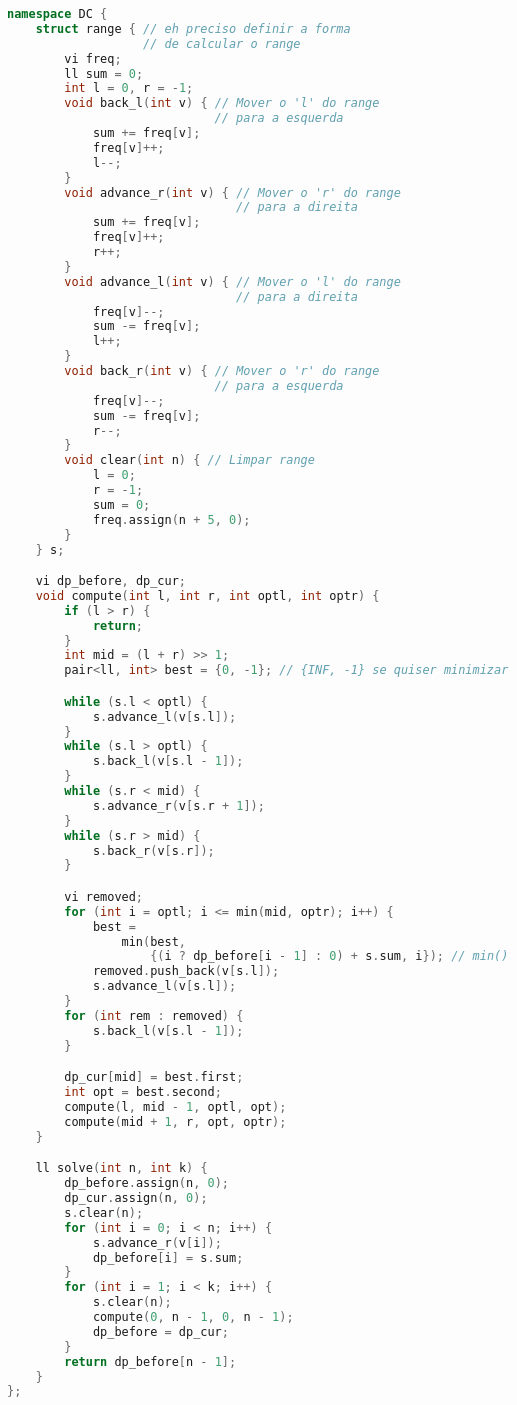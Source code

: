 \documentclass[10pt, a4paper, oneside]{book}
\begin{document}
\begin{lstlisting}[language=C++]
namespace DC {
    struct range { // eh preciso definir a forma
                   // de calcular o range
        vi freq;
        ll sum = 0;
        int l = 0, r = -1;
        void back_l(int v) { // Mover o 'l' do range
                             // para a esquerda
            sum += freq[v];
            freq[v]++;
            l--;
        }
        void advance_r(int v) { // Mover o 'r' do range
                                // para a direita
            sum += freq[v];
            freq[v]++;
            r++;
        }
        void advance_l(int v) { // Mover o 'l' do range
                                // para a direita
            freq[v]--;
            sum -= freq[v];
            l++;
        }
        void back_r(int v) { // Mover o 'r' do range
                             // para a esquerda
            freq[v]--;
            sum -= freq[v];
            r--;
        }
        void clear(int n) { // Limpar range
            l = 0;
            r = -1;
            sum = 0;
            freq.assign(n + 5, 0);
        }
    } s;

    vi dp_before, dp_cur;
    void compute(int l, int r, int optl, int optr) {
        if (l > r) {
            return;
        }
        int mid = (l + r) >> 1;
        pair<ll, int> best = {0, -1}; // {INF, -1} se quiser minimizar

        while (s.l < optl) {
            s.advance_l(v[s.l]);
        }
        while (s.l > optl) {
            s.back_l(v[s.l - 1]);
        }
        while (s.r < mid) {
            s.advance_r(v[s.r + 1]);
        }
        while (s.r > mid) {
            s.back_r(v[s.r]);
        }

        vi removed;
        for (int i = optl; i <= min(mid, optr); i++) {
            best =
                min(best,
                    {(i ? dp_before[i - 1] : 0) + s.sum, i}); // min() se quiser minimizar
            removed.push_back(v[s.l]);
            s.advance_l(v[s.l]);
        }
        for (int rem : removed) {
            s.back_l(v[s.l - 1]);
        }

        dp_cur[mid] = best.first;
        int opt = best.second;
        compute(l, mid - 1, optl, opt);
        compute(mid + 1, r, opt, optr);
    }

    ll solve(int n, int k) {
        dp_before.assign(n, 0);
        dp_cur.assign(n, 0);
        s.clear(n);
        for (int i = 0; i < n; i++) {
            s.advance_r(v[i]);
            dp_before[i] = s.sum;
        }
        for (int i = 1; i < k; i++) {
            s.clear(n);
            compute(0, n - 1, 0, n - 1);
            dp_before = dp_cur;
        }
        return dp_before[n - 1];
    }
};
\end{lstlisting}
\hfill
\end{document}
